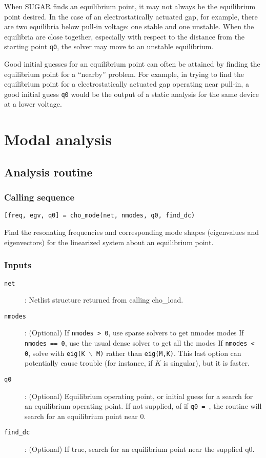 When SUGAR finds an equilibrium point, it may not always be the
equilibrium point desired.  In the case of an electrostatically actuated
gap, for example, there are two equilibria below pull-in voltage:
one stable and one unstable.  When the equilibria are close together,
especially with respect to the distance from the starting point \texttt{q0},
the solver may move to an unstable equilibrium.

Good initial guesses for an equilibrium point can often be attained
by finding the equilibrium point for a ``nearby'' problem.  For example,
in trying to find the equilibrium point for a electrostatically actuated
gap operating near pull-in, a good initial guess \texttt{q0} would
be the output of a static analysis for the same device at a lower voltage.


\section{Modal analysis}

\subsection*{Analysis routine}

\subsubsection*{Calling sequence}

\begin{verbatim}
[freq, egv, q0] = cho_mode(net, nmodes, q0, find_dc)
\end{verbatim}

Find the resonating frequencies and corresponding mode shapes
(eigenvalues and eigenvectors) for the linearized system about
an equilibrium point.

\subsubsection*{Inputs}

\begin{description}
\item[\texttt{net}]: 
  Netlist structure returned from calling cho\_load.
\item[\texttt{nmodes}]: 
  (Optional)  If \texttt{nmodes > 0}, use sparse solvers to get nmodes modes
  If \texttt{nmodes == 0}, use the usual dense solver to get all the modes
  If \texttt{nmodes < 0}, solve with \texttt{eig(K $\backslash$ M)} rather than 
  \texttt{eig(M,K)}.  This last option can potentially cause trouble (for 
  instance, if $K$ is singular), but it is faster.

\item[\texttt{q0}]: 
  (Optional) Equilibrium operating point, or initial guess for
  a search for an equilibrium operating point.  If not supplied,
  of if \texttt{q0 = {}}, 
  the routine will search for an equilibrium point near 0.
\item[\texttt{find\_dc}]: 
  (Optional)  If true, search for an equilibrium point
  near the supplied q0.
\end{description}

